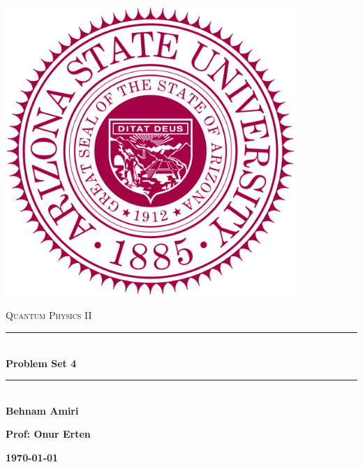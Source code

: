 \documentclass[fleqn]{article}
\begin{document}
  \begin{titlepage}

    \newcommand{\HRule}{\rule{\linewidth}{0.5mm}}

    \center

    \begin{center}
      \includegraphics[height=11cm, width=11cm]{asu.png}
    \end{center}

    \vline

    \textsc{\LARGE Quantum Physics II}\\[1.5cm]

    \HRule \\[0.5cm]
    { \huge \bfseries Problem Set 4}\\[0.4cm] 
    \HRule \\[1.0cm]

    \textbf{Behnam Amiri}

    \bigbreak

    \textbf{Prof: Onur Erten}

    \bigbreak

    \textbf{{\large \today}\\[2cm]}

    \vfill

  \end{titlepage}
\end{document}

